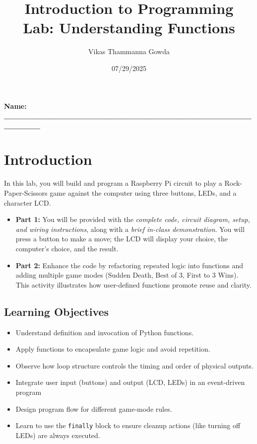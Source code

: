 \documentclass[a4paper,11pt]{article}
\title{Introduction to Programming \\ Lab: Understanding Functions}
\author{Vikas Thammanna Gowda}
\date{07/29/2025}
\begin{document}
\maketitle

\noindent \textbf{Name: \_\_\_\_\_\_\_\_\_\_\_\_\_\_\_\_\_\_\_\_\_\_\_\_\_\_\_\_\_\_\_\_\_\_\_\_\_\_\_\_\_\_\_\_\_\_\_}
\section*{Introduction}
In this lab, you will build and program a Raspberry Pi circuit to play a Rock-Paper-Scissors game against the computer using three buttons, LEDs, and a character LCD.

\begin{itemize}
\item \textbf{Part 1:} You will be provided with the \textit{complete code, circuit diagram, setup, 
and wiring instructions}, along with a \textit{brief in-class demonstration}. 
You will press a button to make a move; the LCD will display your choice, the computer's choice, and the result.

\item \textbf{Part 2:}  Enhance the code by refactoring repeated logic into functions 
and adding multiple game modes (Sudden Death, Best of 3, First to 3 Wins). 
This activity illustrates how user-defined functions promote reuse and clarity.
\end{itemize} 

\subsection*{Learning Objectives}
\begin{itemize}
    \item Understand definition and invocation of Python functions.

\item Apply functions to encapsulate game logic and avoid repetition.

\item Observe how loop structure controls the timing and order of physical outputs.

\item Integrate user input (buttons) and output (LCD, LEDs) in an event-driven program

\item Design program flow for different game‑mode rules.

\item Learn to use the \texttt{finally} block to ensure cleanup actions (like turning off LEDs) are always executed.
\end{itemize}
\end{document}
